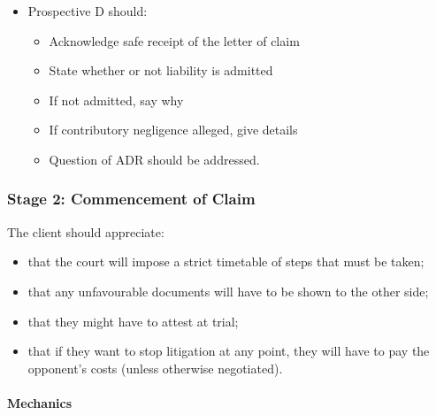 \documentclass[
]{article}
\providecommand{\tightlist}{%
  \setlength{\itemsep}{0pt}\setlength{\parskip}{0pt}}
\begin{document}
\begin{itemize}
\begin{itemize}
    \begin{itemize}
    \tightlist
    \item
      Prospective D should:

      \begin{itemize}
      \tightlist
      \item
        Acknowledge safe receipt of the letter of claim
      \item
        State whether or not liability is admitted
      \item
        If not admitted, say why
      \item
        If contributory negligence alleged, give details
      \item
        Question of ADR should be addressed.
      \end{itemize}
    \end{itemize}
  \end{itemize}
\end{itemize}

\hypertarget{stage-2-commencement-of-claim}{%
\subsubsection{Stage 2: Commencement of
Claim}\label{stage-2-commencement-of-claim}}

The client should appreciate:

\begin{itemize}
\tightlist
\item
  that the court will impose a strict timetable of steps that must be
  taken;
\item
  that any unfavourable documents will have to be shown to the other
  side;
\item
  that they might have to attest at trial;
\item
  that if they want to stop litigation at any point, they will have to
  pay the opponent's costs (unless otherwise negotiated).
\end{itemize}

\hypertarget{mechanics}{%
\paragraph{Mechanics}\label{mechanics}}
\end{document}

